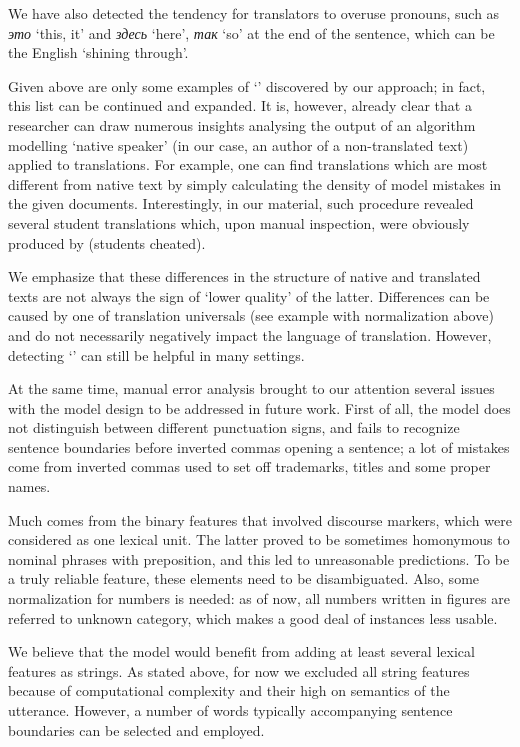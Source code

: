 \documentclass[output=paper]{langsci/langscibook.cls}
\begin{document}
We have also detected the tendency for  translators to overuse pronouns, such as \textit{это} `this, it' and \textit{здесь} `here', \textit{так} `so' at the end of the sentence, which can be the English  `shining through'.

Given above are only some examples of `' discovered by our approach; in fact, this list can be continued and expanded. It is, however, already clear that a researcher can draw numerous insights analysing the output of an algorithm modelling `native speaker' (in our case, an author of a non-translated text) applied to translations. For example, one can find translations which are most different from native text by simply calculating the density of model mistakes in the given documents. Interestingly, in our material, such procedure revealed several student translations which, upon manual inspection, were obviously produced by  (students cheated).

We emphasize that these differences in the structure of native and translated texts are not always the sign of `lower quality' of the latter. Differences can be caused by one of translation universals (see example with normalization above) and do not necessarily negatively impact the language of translation. However, detecting `' can still be helpful in many settings.

At the same time, manual error analysis brought to our attention several issues with the model design to be addressed in future work. First of all, the model does not distinguish between different punctuation signs, and fails to recognize sentence boundaries before inverted commas opening a sentence; a lot of mistakes come from inverted commas used to set off trademarks, titles and some proper names.

Much  comes from the binary features that involved  discourse markers, which were considered as one lexical unit. The latter proved to be sometimes homonymous to nominal phrases with preposition, and this led to unreasonable predictions. To be a truly reliable feature, these elements need to be disambiguated. Also, some normalization for numbers is needed: as of now, all numbers written in figures are referred to unknown category, which makes a good deal of instances less usable.

We believe that the model would benefit from adding at least several lexical features as strings. As stated above, for now we excluded all string features because of computational complexity and their high  on semantics of the utterance. However, a number of words typically accompanying sentence boundaries can be selected and employed.
\end{document}

